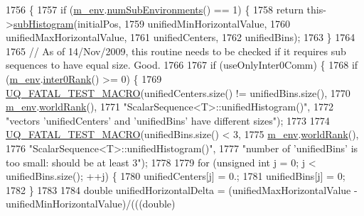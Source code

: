 \begin{DoxyCode}
1756 \{
1757   \textcolor{keywordflow}{if} (\hyperlink{class_q_u_e_s_o_1_1_scalar_sequence_a71618cd6351b29361b437af68447a4c8}{m\_env}.\hyperlink{class_q_u_e_s_o_1_1_base_environment_ac0345f57e31ef7833e379ed972bd094d}{numSubEnvironments}() == 1) \{
1758     \textcolor{keywordflow}{return} this->\hyperlink{class_q_u_e_s_o_1_1_scalar_sequence_a80e9aa5156dfaedbdc5ecd0fee6acb9f}{subHistogram}(initialPos,
1759                               unifiedMinHorizontalValue,
1760                               unifiedMaxHorizontalValue,
1761                               unifiedCenters,
1762                               unifiedBins);
1763   \}
1764 
1765   \textcolor{comment}{// As of 14/Nov/2009, this routine needs to be checked if it requires sub sequences to have equal size.
       Good.}
1766 
1767   \textcolor{keywordflow}{if} (useOnlyInter0Comm) \{
1768     \textcolor{keywordflow}{if} (\hyperlink{class_q_u_e_s_o_1_1_scalar_sequence_a71618cd6351b29361b437af68447a4c8}{m\_env}.\hyperlink{class_q_u_e_s_o_1_1_base_environment_ae106b5bb8a80b655b88b3a26b1e7c185}{inter0Rank}() >= 0) \{
1769       \hyperlink{_defines_8h_a56d63d18d0a6d45757de47fcc06f574d}{UQ\_FATAL\_TEST\_MACRO}(unifiedCenters.size() != unifiedBins.size(),
1770                           \hyperlink{class_q_u_e_s_o_1_1_scalar_sequence_a71618cd6351b29361b437af68447a4c8}{m\_env}.\hyperlink{class_q_u_e_s_o_1_1_base_environment_a78b57112bbd0e6dd0e8afec00b40ffa7}{worldRank}(),
1771                           \textcolor{stringliteral}{"ScalarSequence<T>::unifiedHistogram()"},
1772                           \textcolor{stringliteral}{"vectors 'unifiedCenters' and 'unifiedBins' have different sizes"});
1773 
1774       \hyperlink{_defines_8h_a56d63d18d0a6d45757de47fcc06f574d}{UQ\_FATAL\_TEST\_MACRO}(unifiedBins.size() < 3,
1775                           \hyperlink{class_q_u_e_s_o_1_1_scalar_sequence_a71618cd6351b29361b437af68447a4c8}{m\_env}.\hyperlink{class_q_u_e_s_o_1_1_base_environment_a78b57112bbd0e6dd0e8afec00b40ffa7}{worldRank}(),
1776                           \textcolor{stringliteral}{"ScalarSequence<T>::unifiedHistogram()"},
1777                           \textcolor{stringliteral}{"number of 'unifiedBins' is too small: should be at least 3"});
1778 
1779       \textcolor{keywordflow}{for} (\textcolor{keywordtype}{unsigned} \textcolor{keywordtype}{int} j = 0; j < unifiedBins.size(); ++j) \{
1780         unifiedCenters[j] = 0.;
1781         unifiedBins[j] = 0;
1782       \}
1783 
1784       \textcolor{keywordtype}{double} unifiedHorizontalDelta = (unifiedMaxHorizontalValue - unifiedMinHorizontalValue)/(((\textcolor{keywordtype}{double}) 

\end{DoxyCode}
